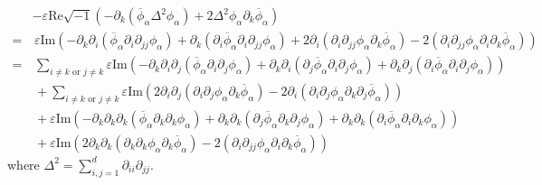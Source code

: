 \documentclass[10pt,twoside,a4paper]{article}
\numberwithin{equation}{section}\allowdisplaybreaks
\begin{document}
\begin{align*}
&-	\varepsilon\mathrm{Re} \sqrt{-1}	\left(-\partial_k\left( \overline{\phi }_{\alpha }\Delta^2 \phi_\alpha \right)+2  \Delta^2 \phi_\alpha\partial_k \overline{\phi}_\alpha \right)\\
=&\,\varepsilon\mathrm{Im}	\left(-\partial_k \partial_i \left( \overline{\phi }_{\alpha }\partial_{i}\partial_{jj} \phi_\alpha \right)+\partial_k  \left( \partial_i\overline{\phi }_{\alpha }\partial_{i}\partial_{jj} \phi_\alpha \right)+2\partial_i \left(\partial_{i}\partial_{jj} \phi_\alpha\partial_k \overline{\phi}_\alpha\right)-2 \left(\partial_{i}\partial_{jj} \phi_\alpha\partial_i\partial_k \overline{\phi}_\alpha\right)\right)\\
=& \, \sum_{i \neq k \text{ or } j \neq k}\varepsilon\mathrm{Im}	\left(-\partial_k \partial_i\partial_{j} \left( \overline{\phi }_{\alpha }\partial_{i}\partial_{j} \phi_\alpha \right)+\partial_k \partial_i \left( \partial_{j}\overline{\phi }_{\alpha }\partial_{i}\partial_{j} \phi_\alpha \right)+\partial_k  \partial_{j}\left( \partial_i\overline{\phi }_{\alpha }\partial_{i}\partial_{j} \phi_\alpha \right) \right)\\
&\,+\sum_{i \neq k \text{ or } j \neq k}\varepsilon\mathrm{Im}	\left( 2 \partial_i \partial_{j} \left(\partial_{i}\partial_{j} \phi_\alpha\partial_k \overline{\phi}_\alpha\right)-2\partial_i \left(\partial_{i}\partial_{j} \phi_\alpha\partial_k \partial_{j}\overline{\phi}_\alpha\right)  \right)\\
&\,+\varepsilon\mathrm{Im}	\left(-\partial_k \partial_k\partial_{k} \left( \overline{\phi }_{\alpha }\partial_{k}\partial_{k} \phi_\alpha \right)+\partial_k \partial_k \left( \partial_{j}\overline{\phi }_{\alpha }\partial_{k}\partial_{j} \phi_\alpha \right)+\partial_k  \partial_{k}\left( \partial_i\overline{\phi }_{\alpha }\partial_{i}\partial_{k} \phi_\alpha \right) \right)\\
&\,+\varepsilon\mathrm{Im}	\left( 2 \partial_k \partial_{k} \left(\partial_{k}\partial_{k} \phi_\alpha\partial_k \overline{\phi}_\alpha\right)-2 \left(\partial_{i}\partial_{jj} \phi_\alpha\partial_i\partial_k \overline{\phi}_\alpha\right) \right)
\end{align*}
where $ \Delta^2=\sum_{i,j=1}^d \partial_{ii}\partial_{jj}. $
			
\end{document}
